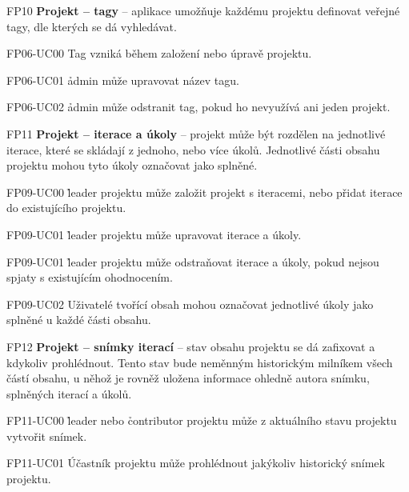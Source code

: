 \begin{dl}
   \item[FP10]
   \textbf{Projekt – tagy} – aplikace umožňuje každému projektu definovat veřejné tagy, dle kterých se dá vyhledávat.
   \begin{dl}
      \item[FP06-UC00] Tag vzniká během založení nebo úpravě projektu.
      \item[FP06-UC01] \h{admin} může upravovat název tagu.
      \item[FP06-UC02] \h{admin} může odstranit tag, pokud ho nevyužívá ani jeden projekt.
   \end{dl}


   \item[FP11]
   \textbf{Projekt – iterace a úkoly} – projekt může být rozdělen na jednotlivé iterace, které se skládají z jednoho, nebo více úkolů.
   Jednotlivé části obsahu projektu mohou tyto úkoly označovat jako splněné.
   \begin{dl}
      \item[FP09-UC00] \h{leader} projektu může založit projekt s iteracemi, nebo přidat iterace do existujícího projektu.
      \item[FP09-UC01] \h{leader} projektu může upravovat iterace a úkoly.
      \item[FP09-UC01] \h{leader} projektu může odstraňovat iterace a úkoly, pokud nejsou spjaty s existujícím ohodnocením.
      \item[FP09-UC02] Uživatelé tvořící obsah mohou označovat jednotlivé úkoly jako splněné u každé části obsahu.
   \end{dl}


   \item[FP12]
   \textbf{Projekt – snímky iterací} – stav obsahu projektu se dá zafixovat a kdykoliv prohlédnout.
   Tento stav bude neměnným historickým milníkem všech částí obsahu, u něhož je rovněž uložena informace ohledně autora snímku, splněných iterací a úkolů.
   \begin{dl}
      \item[FP11-UC00] \h{leader} nebo \h{contributor} projektu může z aktuálního stavu projektu vytvořit snímek.
      \item[FP11-UC01] Účastník projektu může prohlédnout jakýkoliv historický snímek projektu.
   \end{dl}



\end{dl}
